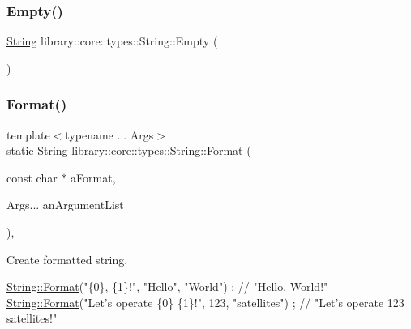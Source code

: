 \mbox{\label{classlibrary_1_1core_1_1types_1_1_string_a4d359cb0dba46e14ca46f90e728c2b96}} 
\subsubsection{\texorpdfstring{Empty()}{Empty()}}
{\footnotesize\ttfamily \hyperlink{classlibrary_1_1core_1_1types_1_1_string}{String} library\+::core\+::types\+::\+String\+::\+Empty (\begin{DoxyParamCaption}{ }\end{DoxyParamCaption})\hspace{0.3cm}{\ttfamily [static]}}

\mbox{\label{classlibrary_1_1core_1_1types_1_1_string_ae1745f54be6952d7b5a388239377b287}} 
\subsubsection{\texorpdfstring{Format()}{Format()}}
{\footnotesize\ttfamily template$<$typename ... Args$>$ \\
static \hyperlink{classlibrary_1_1core_1_1types_1_1_string}{String} library\+::core\+::types\+::\+String\+::\+Format (\begin{DoxyParamCaption}\item[{const char $\ast$}]{a\+Format,  }\item[{Args...}]{an\+Argument\+List }\end{DoxyParamCaption})\hspace{0.3cm}{\ttfamily [inline]}, {\ttfamily [static]}}



Create formatted string. 


\begin{DoxyCode}
\hyperlink{classlibrary_1_1core_1_1types_1_1_string_ae1745f54be6952d7b5a388239377b287}{String::Format}(\textcolor{stringliteral}{"\{0\}, \{1\}!"}, \textcolor{stringliteral}{"Hello"}, \textcolor{stringliteral}{"World"}) ; \textcolor{comment}{// "Hello, World!"}
\hyperlink{classlibrary_1_1core_1_1types_1_1_string_ae1745f54be6952d7b5a388239377b287}{String::Format}(\textcolor{stringliteral}{"Let's operate \{0\} \{1\}!"}, 123, \textcolor{stringliteral}{"satellites"}) ; \textcolor{comment}{// "Let's operate 123
       satellites!"}
\end{DoxyCode}



